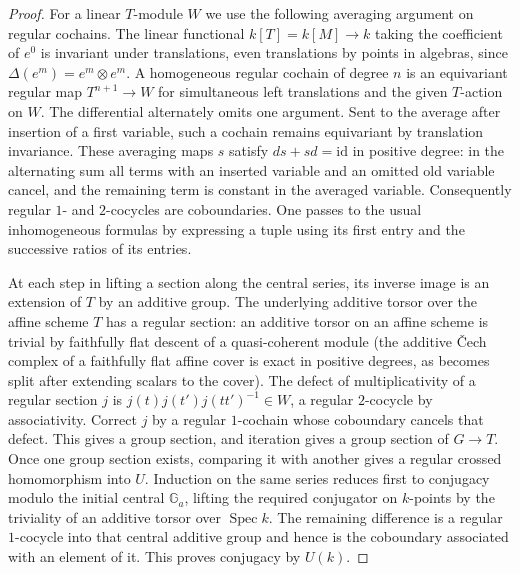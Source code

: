 \documentclass[11pt,a4paper,openany,oneside]{book}
\theoremstyle{resultstyle}
\theoremstyle{definition}
\numberwithin{equation}{chapter}
\begin{document}
\begin{proof}
For a linear \(T\)-module \(W\) we use the following averaging
argument on regular cochains. The linear functional
\(k[T]=k[M]\to k\) taking the coefficient of \(e^0\) is invariant
under translations, even translations by points in algebras,
since \(\Delta(e^m)=e^m\otimes e^m\).
A homogeneous regular cochain of degree \(n\) is an equivariant
regular map \(T^{n+1}\to W\) for simultaneous left translations
and the given \(T\)-action on \(W\). The differential alternately
omits one argument. Sent to the average after insertion of a
first variable, such a cochain remains equivariant by translation
invariance. These averaging maps \(s\) satisfy
\(ds+sd=\mathrm{id}\) in positive degree: in the alternating sum
all terms with an inserted variable and an omitted old variable
cancel, and the remaining term is constant in the averaged
variable. Consequently regular \(1\)- and \(2\)-cocycles are
coboundaries. One passes to the usual inhomogeneous formulas
by expressing a tuple using its first entry and the successive
ratios of its entries.

At each step in lifting a section along the central series, its
inverse image is an extension of \(T\) by an additive group. The
underlying additive torsor over the affine scheme \(T\) has a
regular section: an additive torsor on an affine scheme is
trivial by faithfully flat descent of a quasi-coherent module
(the additive Čech complex of a faithfully flat affine cover
is exact in positive degrees, as becomes split after extending
scalars to the cover).
The defect of multiplicativity of a regular section \(j\) is
\(j(t)j(t')j(tt')^{-1}\in W\), a regular \(2\)-cocycle by
associativity. Correct \(j\) by a regular \(1\)-cochain whose
coboundary cancels that defect. This gives a group section, and
iteration gives a group section of \(G\to T\).
Once one group section exists, comparing it with another gives
a regular crossed homomorphism into \(U\). Induction on the same
series reduces first to conjugacy modulo the initial central
\(\mathbb G_a\), lifting the required conjugator on \(k\)-points
by the triviality of an additive torsor over \(\operatorname{Spec}k\).
The remaining difference is a regular \(1\)-cocycle into that
central additive group and hence is the coboundary associated
with an element of it. This proves conjugacy by \(U(k)\).


\end{proof}
\end{document}
